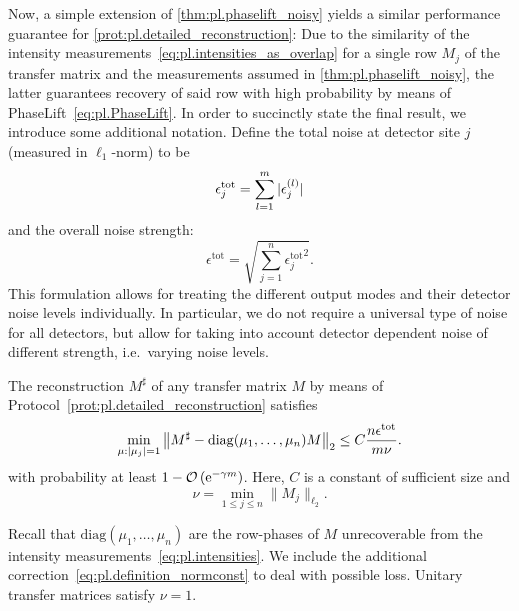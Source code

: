Now, a simple extension of \cref{thm:pl.phaselift_noisy} yields a similar performance guarantee for \cref{prot:pl.detailed_reconstruction}:
Due to the similarity of the intensity measurements~\eqref{eq:pl.intensities_as_overlap} for a single row $M_j$ of the transfer matrix and the measurements assumed in \cref{thm:pl.phaselift_noisy}, the latter guarantees recovery of said row with high probability by means of PhaseLift~\eqref{eq:pl.PhaseLift}.
In order to succinctly state the final result, we introduce some additional notation.
Define the total noise at detector site $j$ (measured in $\ell_1$-norm) to be
\[
  \epsilon_j^{\mathrm{tot}}= \sum_{l=1}^m {\vert\epsilon_j^{(l)}\vert}
  \label{eq:pl.error_term_summand}
\]
and the overall noise strength:
\[
  \epsilon^{\mathrm{tot}} = \sqrt{ \sum_{j=1}^n {\epsilon_j^{\mathrm{tot}}}^2}.
\]
This formulation allows for treating the different output modes and their detector noise levels individually.
In particular, we do not require a universal type of noise for all detectors, but allow for taking into account detector dependent noise of different strength, i.e.\ varying noise levels.

\begin{corollary}%
  \label{cor:pl.performance_guarantee}
  The reconstruction ${M}^\sharp$ of any transfer matrix ${M}$ by means of Protocol~\ref{prot:pl.detailed_reconstruction} satisfies
    \[
      \min_{{\mu}: {\vert\mu_j\vert} = 1} \left\|  {M}^\sharp -  \mathrm{diag}(\mu_1,\ldots,\mu_n) {M} \right\|_2
      \leq C \frac{n \epsilon^\mathrm{tot}}{m \nu}.
      \label{eq:pl.total_bound}
    \]
  with probability at least $1 - {\mathcal{O}} \left( \mathrm{e}^{-\gamma m}\right)$.
  Here, $C$ is a constant of sufficient size and
  \[
    \nu = \min_{1 \leq j \leq n} \| {M}_j \|_{\ell_2}.
    \label{eq:pl.definition_normconst}
  \]
\end{corollary}
Recall that $\mathrm{diag}(\mu_1, \ldots, \mu_n)$ are the row-phases of ${M}$ unrecoverable from the intensity measurements~\eqref{eq:pl.intensities}.
We include the additional correction~\eqref{eq:pl.definition_normconst} to deal with possible loss.
Unitary transfer matrices satisfy $\nu = 1$.

